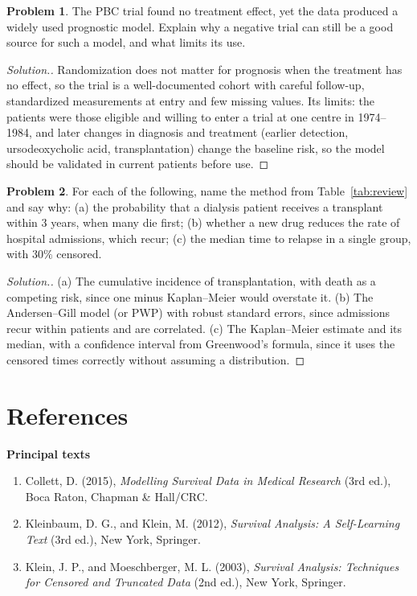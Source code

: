 \documentclass[11pt,a4paper]{article}
\numberwithin{equation}{section}
\theoremstyle{definition}
\newtheorem{problemx}{Problem}[subsection]
\newenvironment{problem}{\begin{problemx}}{\end{problemx}}
\newenvironment{solution}
  {\renewcommand{\qedsymbol}{}\begin{proof}[\textit{Solution}.]}
  {\end{proof}}
\newcommand{\subhead}[1]{%
  \par\medskip\noindent\textbf{#1}\par\nobreak\smallskip}
\begin{document}
\begin{problem}
The PBC trial found no treatment effect, yet the data produced a widely used prognostic model. Explain why a negative trial can still be a good source for such a model, and what limits its use.
\end{problem}

\begin{solution}
Randomization does not matter for prognosis when the treatment has no effect, so the trial is a well-documented cohort with careful follow-up, standardized measurements at entry and few missing values. Its limits: the patients were those eligible and willing to enter a trial at one centre in 1974--1984, and later changes in diagnosis and treatment (earlier detection, ursodeoxycholic acid, transplantation) change the baseline risk, so
the model should be validated in current patients before use.
\end{solution}

\begin{problem}
For each of the following, name the method from Table~\ref{tab:review} and say why: (a) the probability that a dialysis patient receives a transplant within $3$ years, when many die first; (b) whether a new drug reduces the rate of hospital admissions, which recur; (c) the median time to relapse in a single group, with $30\%$ censored.
\end{problem}

\begin{solution}
(a) The cumulative incidence of transplantation, with death as a competing risk, since one minus Kaplan--Meier would overstate it. (b) The Andersen--Gill model (or PWP) with robust standard errors, since admissions recur within patients and are correlated. (c) The Kaplan--Meier estimate and its median, with a confidence interval from Greenwood's formula, since it uses the censored times correctly without assuming a distribution.
\end{solution}


\section*{References}
\sloppy

\subhead{Principal texts}
\begin{enumerate}
\item Collett, D. (2015), \emph{Modelling Survival Data in Medical Research} (3rd ed.), Boca Raton, Chapman \& Hall/CRC.
\item Kleinbaum, D. G., and Klein, M. (2012), \emph{Survival Analysis: A Self-Learning Text} (3rd ed.), New York, Springer.
\item Klein, J. P., and Moeschberger, M. L. (2003), \emph{Survival Analysis: Techniques for Censored and Truncated Data} (2nd ed.), New York, Springer.
\end{enumerate}
\end{document}
